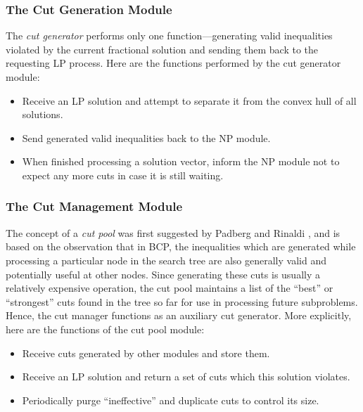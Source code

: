 \subsubsection{The Cut Generation Module}

The {\em cut generator} performs only one function---generating valid
inequalities violated by the current fractional solution and sending
them back to the requesting LP process. Here are the functions
performed by the cut generator module:
\begin{itemize}
        \item Receive an LP solution and attempt to
        separate it from the convex hull of all solutions.
        \item Send generated valid inequalities back to the NP module.  
        \item When finished processing a solution vector, inform the
        NP module not to expect any more cuts in case it is still waiting.
\end{itemize}

\subsubsection{The Cut Management Module}

The concept of a {\em cut pool} was first suggested by Padberg and
Rinaldi \cite{padb:branc}, and is based on the observation that in BCP, the
inequalities which are generated while processing a particular node in
the search tree are also generally valid and potentially useful at
other nodes. Since generating these cuts is usually a relatively
expensive operation, the cut pool maintains a list of the ``best'' or
``strongest'' cuts found in the tree so far for use in processing
future subproblems. Hence, the cut manager functions as an auxiliary cut
generator. More explicitly, here are the functions of the cut pool
module:
\begin{itemize}
        \item Receive cuts generated by other modules and store them.
        \item Receive an LP solution and return a
set of cuts which this solution violates.
        \item Periodically purge ``ineffective'' and duplicate cuts
to control its size.
\end{itemize}

